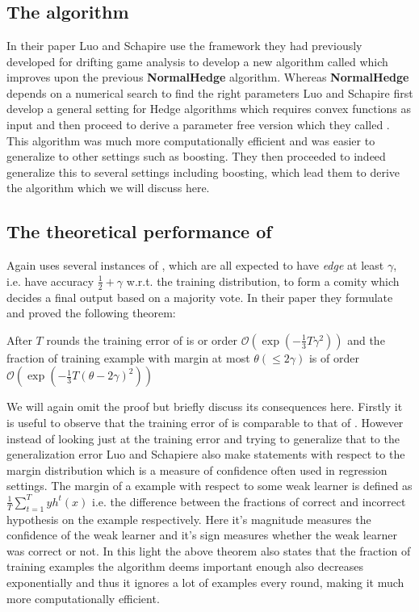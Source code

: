 \section{\NHB}
\label{sec:NHB}
\subsection{The algorithm}
\label{subsec:NHAlgo}
In their paper \cite{Luo2014} Luo and Schapire use the framework they had previously developed for drifting game analysis to develop a new algorithm called \adaN which improves upon the previous \textbf{NormalHedge} algorithm. Whereas \textbf{NormalHedge} depends on a numerical search to find the right parameters Luo and Schapire first develop a general setting for Hedge algorithms which requires convex functions as input and then proceed to derive a parameter free version which they called \adaN. This algorithm was much more computationally efficient and was easier to generalize to other settings such as boosting. They then proceeded to indeed generalize this to several settings including boosting, which lead them to derive the \NHB algorithm which we will discuss here. 

\subsection{The theoretical performance of \NHB}
\label{subsec:NHTheoPerf}
 Again \NHB uses several instances of \weak, which are all expected to have \textit{edge} at least $\gamma$, i.e. have accuracy $\frac12 + \gamma$ w.r.t. the training distribution, to form a comity which decides a final output based on a majority vote. In their paper they formulate and proved the following theorem: 
 \begin{theorem}\label{Thm:NHBPerf}\cite{Luo2014}
 After $T$ rounds the training error of \NHB is or order $\mathcal{O}(\exp(-\frac13T\gamma^2))$ and the fraction of training example with margin at most $\theta(\leq2\gamma)$ is of order $\mathcal{O}(\exp(-\frac13T(\theta-2\gamma)^2))$

 \end{theorem}

 We will again omit the proof but briefly discuss its consequences here. Firstly it is useful to observe that the training error of \NHB is comparable to that of \adaB. However instead of looking just at the training error and trying to generalize that to the generalization error Luo and Schapiere also make statements with respect to the margin distribution which is a measure of confidence often used in regression settings. The margin of a example with respect to some weak learner is defined as $\frac1T \sum^T_{t=1}yh^t(x)$ i.e. the difference between the fractions of correct and incorrect hypothesis on the example respectively. Here it's magnitude measures the confidence of the weak learner and it's sign measures whether the weak learner was correct or not. In this light the above theorem also states that the fraction of training examples the algorithm deems important enough also decreases exponentially and thus it ignores a lot of examples every round, making it much more computationally efficient. 

